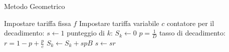 \begin{algorithm}
    \caption{Metodo Geometrico}
    \label{alg_metodo_geometrico}
    \begin{algorithmic}
      \STATE Impostare tariffa fissa $f$
      \STATE Impostare tariffa variabile $c$
        \STATE contatore per il decadimento: $s \leftarrow 1$
          \STATE punteggio di $k$: $S_k \leftarrow 0$
        \ENDFOR
        \REPEAT
            \STATE $p = \frac{1}{D}$
            \STATE tasso di decadimento: $r = 1 - p + \frac{p}{c}$
          \ENDIF
            \STATE $S_k \leftarrow S_k + spB$
            \STATE $s \leftarrow sr$
          \ENDIF
        \ENDFOR
      \ENDFOR
    \end{algorithmic}
\end{algorithm}
